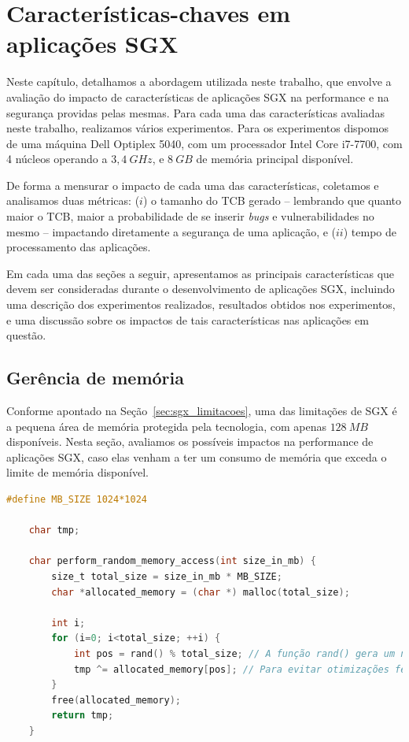 \chapter{Características-chaves em aplicações SGX}
\label{chapter:abordagem}

Neste capítulo, detalhamos a abordagem utilizada neste trabalho, que envolve a
avaliação do impacto de características de aplicações SGX na performance e na
segurança providas pelas mesmas. Para cada uma das características avaliadas
neste trabalho, realizamos vários experimentos. Para os experimentos dispomos de
uma máquina Dell Optiplex 5040, com um processador Intel Core i7-7700, com 4
núcleos operando a $3,4\ GHz$, e $8\ GB$ de memória principal disponível.

De forma a mensurar o impacto de cada uma das características, coletamos e
analisamos duas métricas: ($i$) o tamanho do TCB gerado -- lembrando que quanto
maior o TCB, maior a probabilidade de se inserir \textit{bugs} e
vulnerabilidades no mesmo -- impactando diretamente a segurança de uma
aplicação, e ($ii$) tempo de processamento das aplicações.

Em cada uma das seções a seguir, apresentamos as principais características que
devem ser consideradas durante o desenvolvimento de aplicações SGX, incluindo
uma descrição dos experimentos realizados, resultados obtidos nos experimentos,
e uma discussão sobre os impactos de tais características nas aplicações em
questão.  

\section{Gerência de memória}
\label{sec:abordagem_gerencia_memoria}

Conforme apontado na Seção~\ref{sec:sgx_limitacoes}, uma das limitações de SGX é
a pequena área de memória protegida pela tecnologia, com apenas $128\ MB$
disponíveis.
Nesta seção, avaliamos os possíveis impactos na performance de aplicações SGX,
caso elas venham a ter um consumo de memória que exceda o limite de memória
disponível.

\begin{lstlisting}[language=C, label=lst:acesso_aleatorio, caption={Pseudocódigo
do experimento de acesso aleatório à memória.}]
    #define MB_SIZE 1024*1024

    char tmp;

    char perform_random_memory_access(int size_in_mb) {
        size_t total_size = size_in_mb * MB_SIZE;
        char *allocated_memory = (char *) malloc(total_size);
        
        int i;
        for (i=0; i<total_size; ++i) {
            int pos = rand() % total_size; // A função rand() gera um número aleatório.
            tmp ^= allocated_memory[pos]; // Para evitar otimizações feitas pelo compilador.
        }
        free(allocated_memory);
        return tmp;
    }
\end{lstlisting}

